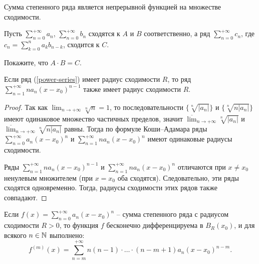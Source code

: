 \begin{corollary}
    Сумма степенного ряда является непрерывной функцией на множестве сходимости.
\end{corollary}

\begin{problem}
    Пусть $\sum_{n=0}^{+\infty}a_{n}$, $\sum_{n=0}^{+\infty}b_{n}$ сходятся к $A$ и $B$ соответственно, а ряд $\sum_{n = 0}^{+\infty}c_{n}$, где $c_{n} = \sum_{k = 0}^{n} a_{k}b_{n-k}$, сходится к $C$.

    Покажите, что $A\cdot B = C$.
\end{problem}

\begin{lemma}
    \label{lem1-power-series}
    Если ряд (\ref{power-series}) имеет радиус сходимости $R$, то ряд $\sum_{n = 1}^{+\infty}n a_{n}(x - x_{0})^{n - 1}$ также имеет радиус сходимости $R$.
\end{lemma}

\begin{proof}
    Так как $\lim_{n \to +\infty} \sqrt[n]{n} = 1$, то последовательности $\{\sqrt[n]{|a_{n}|}\}$ и $\{\sqrt[n]{n|a_{n}|}\}$ имеют одинаковое множество частичных пределов, значит $\overline{\lim}_{n \to +\infty} \sqrt[n]{|a_{n}|}$ и $\overline{\lim}_{n \to +\infty} \sqrt[n]{n |a_{n}|}$ равны. Тогда по формуле Коши--Адамара ряды $\sum_{n = 0}^{+\infty} a_{n}(x - x_{0})^{n}$ и $\sum_{n = 1}^{+\infty}n a_{n}(x - x_{0})^{n}$ имеют одинаковые радиусы сходимости.

    Ряды $\sum_{n = 1}^{+\infty}n a_{n}(x - x_{0})^{n - 1}$ и $\sum_{n = 1}^{+\infty}n a_{n}(x - x_{0})^{n}$ отличаются при $x \neq x_{0}$ ненулевым множителем (при $x = x_{0}$ оба сходятся). Следовательно, эти ряды сходятся одновременно. Тогда, радиусы сходимости этих рядов также совпадают.
\end{proof}

\begin{theorem}
    \label{th1-power-series}
    Если $f(x) = \sum_{n = 0}^{+\infty} a_{n}(x - x_{0})^{n}$ -- сумма степенного ряда с радиусом сходимости $R > 0$, то функция $f$ бесконечно дифференцируема в $B_{R}(x_{0})$, и для всякого $n \in \mathbb{N}$ выполнено:
    \[f^{(m)}(x) = \sum_{n = m}^{+\infty}n(n-1)\cdot\ldots\cdot(n - m + 1) a_{n}(x - x_{0})^{n - m}.\]
\end{theorem}

